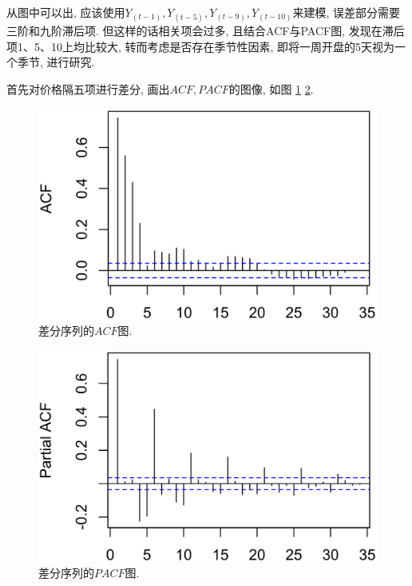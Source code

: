 \documentclass[12pt]{article}
\begin{document}
\qquad 从图中可以出, 应该使用$Y_{(t-1)},Y_{(t-5)},Y_{(t-9)},Y_{(t-10)}$来建模, 误差部分需要三阶和九阶滞后项. 但这样的话相关项会过多, 且结合ACF与PACF图, 发现在滞后项1、5、10上均比较大, 转而考虑是否存在季节性因素, 即将一周开盘的5天视为一个季节, 进行研究. 

\qquad 首先对价格隔五项进行差分, 画出$ACF, PACF$的图像, 如图 \ref{fig:acf1} \ref{fig:pacf1}.
\begin{center}
    \begin{minipage}{0.46\textwidth}
        \begin{figure}
            \centering
            \hspace{-30pt}\includegraphics[width=.95\textwidth]{acf1}
            \caption{差分序列的$ACF$图.\label{fig:acf1}}
        \end{figure}
    \end{minipage}
    \begin{minipage}{0.46\textwidth}
        \begin{figure}
            \centering
            \hspace{-25pt}\includegraphics[width=.95\textwidth]{pacf1}
            \caption{差分序列的$PACF$图.\label{fig:pacf1}}
        \end{figure}
    \end{minipage}
\end{center}
\end{document}
